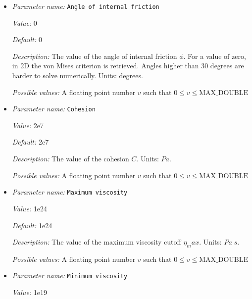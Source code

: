 \begin{itemize}
\item {\it Parameter name:} {\tt Angle of internal friction}
\label{parameters:Material model/Drucker Prager/Viscosity/Angle of internal friction}


{\it Value:} 0


{\it Default:} 0


{\it Description:} The value of the angle of internal friction $\phi$. For a value of zero, in 2D the von Mises criterion is retrieved. Angles higher than 30 degrees are harder to solve numerically. Units: degrees.


{\it Possible values:} A floating point number $v$ such that $0 \leq v \leq \text{MAX\_DOUBLE}$
\item {\it Parameter name:} {\tt Cohesion}
\label{parameters:Material model/Drucker Prager/Viscosity/Cohesion}


{\it Value:} 2e7


{\it Default:} 2e7


{\it Description:} The value of the cohesion $C$. Units: $Pa$.


{\it Possible values:} A floating point number $v$ such that $0 \leq v \leq \text{MAX\_DOUBLE}$
\item {\it Parameter name:} {\tt Maximum viscosity}
\label{parameters:Material model/Drucker Prager/Viscosity/Maximum viscosity}


{\it Value:} 1e24


{\it Default:} 1e24


{\it Description:} The value of the maximum viscosity cutoff $\eta_max$. Units: $Pa\;s$.


{\it Possible values:} A floating point number $v$ such that $0 \leq v \leq \text{MAX\_DOUBLE}$
\item {\it Parameter name:} {\tt Minimum viscosity}
\label{parameters:Material model/Drucker Prager/Viscosity/Minimum viscosity}


{\it Value:} 1e19



\end{itemize}

